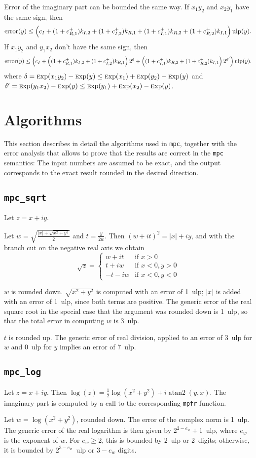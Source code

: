 \documentclass {article}
\newcommand {\mpc}{\texttt {mpc}}
\newcommand {\mpfr}{\texttt {mpfr}}
\newcommand {\ulp}[1]{#1~ulp}
\newcommand {\atantwo}{\operatorname {atan2}}
\DeclareMathOperator{\error}{error}
\newcommand {\Ulp}{{\rm ulp}}
\newcommand {\Exp}{{\rm \textsc exp}}
\begin{document}
Error of the imaginary part can be bounded the same way. If $x_1y_2$ and
$x_2y_1$ have the same sign, then
\[
\error(y) \leq \left(c_I + (1+c_{R,1}^+)k_{I,2} + (1+c_{I,2}^+)k_{R,1} +
(1+c_{I,1}^+)k_{R,2} + (1+c_{R,2}^+)k_{I,1} \right) \Ulp(y).
\]
If $x_1y_2$ and $y_1x_2$ don't have the same sign, then
\[
\error(y) \leq \left( c_I + \left( (1+c_{R,1}^+)k_{I,2} + (1+c_{I,2}^+)k_{R,1}
\right)2^{\delta} + \left( (1+c_{I,1}^+)k_{R,2} + (1+c_{R,2}^+)k_{I,1} \right)
2^{\delta'}\right) \Ulp(y).
\]
where $\delta = \Exp(x_1y_2)-\Exp(y) \leq \Exp(x_1)+\Exp(y_2)-\Exp(y)$ and
$\delta' = \Exp(y_1x_2)-\Exp(y) \leq \Exp(y_1)+\Exp(x_2)-\Exp(y)$.


\section {Algorithms}

This section describes in detail the algorithms used in \mpc, together with the error analysis that allows to prove that the results are correct in the {\mpc} semantics: The input numbers are assumed to be exact, and the output corresponds to the exact result rounded in the desired direction.


\subsection {\texttt {mpc\_sqrt}}

Let $z = x + i y$.

Let $w = \sqrt { \frac {|x| + \sqrt {x^2 + y^2}}{2}}$ and
$t = \frac {y}{2w}$. Then $(w + it)^2 = |x| + iy$, and with the branch cut on the negative real axis we obtain
\[
\sqrt z = \left\{
\begin {array}{cl}
w + i t & \text {if } x > 0 \\
t + i w & \text {if } x < 0, y > 0 \\
-t - i w & \text {if } x < 0, y < 0
\end {array}
\right.
\]

$w$ is rounded down. $\sqrt {x^2 + y^2}$ is computed with an error of \ulp{1}; $|x|$ is added with an error of \ulp{1}, since both terms are positive. The generic error of the real square root in the special case that the argument was rounded down is \ulp{1}, so that the total error in computing $w$ is \ulp{3}.

$t$ is rounded up. The generic error of real division, applied to an error of \ulp{3} for $w$ and \ulp{0} for $y$ implies an error of \ulp{7}.


\subsection {\texttt {mpc\_log}}

Let $z = x + i y$. Then $\log (z) = \frac {1}{2} \log (x^2 + y^2) + i \atantwo (y, x)$. The imaginary part is computed by a call to the corresponding {\mpfr} function.

Let $w = \log (x^2 + y^2)$, rounded down. The error of the complex norm is \ulp{1}. The generic error of the real logarithm is then given by \ulp{$2^{2 - e_w} + 1$}, where $e_w$ is the exponent of $w$. For $e_w \geq 2$, this is bounded by \ulp{2} or 2~digits; otherwise, it is bounded by \ulp{$2^{3 - e_w}$} or $3 - e_w$ digits.
\end{document}
